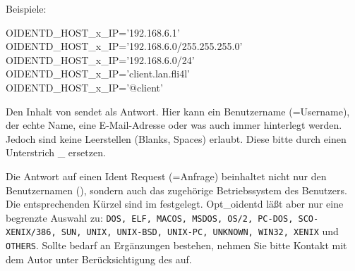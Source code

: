 \begin{description}
  Beispiele: 

  \begin{example}
  OIDENTD\_HOST\_x\_IP='192.168.6.1'\\
  OIDENTD\_HOST\_x\_IP='192.168.6.0/255.255.255.0'\\
  OIDENTD\_HOST\_x\_IP='192.168.6.0/24'\\
  OIDENTD\_HOST\_x\_IP='client.lan.fli4l'\\
  OIDENTD\_HOST\_x\_IP='@client'
  \end{example}
  
    

  Den Inhalt von  sendet  als 
  Antwort. Hier kann ein Benutzername (=Username), der echte Name, eine 
  \mbox{E-Mail}-Adresse oder was auch immer hinterlegt werden. Jedoch sind keine
  Leerstellen (Blanks, Spaces) erlaubt. Diese bitte durch einen Unterstrich
  \_ ersetzen.

 
  Die Antwort auf einen Ident Request (=Anfrage) beinhaltet nicht nur den 
  Benutzernamen (), sondern auch das zugehörige
  Betriebssystem des Benutzers. Die entsprechenden Kürzel sind im
   festgelegt. Opt\_oidentd läßt aber nur eine
  begrenzte Auswahl zu: \texttt{DOS, ELF, MACOS, MSDOS, OS/2, PC-DOS,
  SCO-XENIX/386, SUN, UNIX, UNIX-BSD, UNIX-PC, UNKNOWN, WIN32, XENIX} und 
  \texttt{OTHERS}. Sollte bedarf an Ergänzungen bestehen, nehmen Sie bitte Kontakt
  mit dem Autor unter Berücksichtigung des 
   auf.


\end{description}
  
